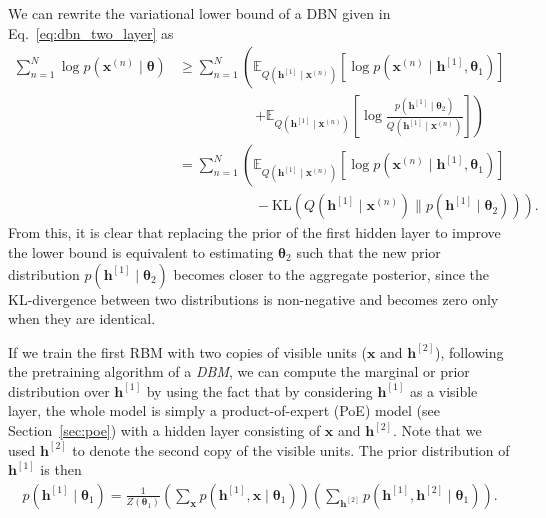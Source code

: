 \documentclass[dissertation,nocontribution,draft*]{aaltoseries}
\newcommand{\qlay}[1]{\left[#1\right]}
\newcommand{\vect}[1]{\mathbf{#1}}
\newcommand{\vects}[1]{\boldsymbol{#1}}
\newcommand{\vh}[0]{\vect{h}}
\newcommand{\vx}[0]{\vect{x}}
\newcommand{\TT}[0]{{\vects{\theta}}}
\newcommand{\KL}[0]{\text{KL}}
\newcommand{\E}[0]{\mathbb{E}}
\begin{document}
We can rewrite the variational lower bound of a 
DBN 
given in
Eq.~\eqref{eq:dbn_two_layer} as
\begin{align}
    \label{eq:dbn_two_layer2}
    \sum_{n=1}^N \log p(\vx^{(n)} \mid \TT) 
    &\geq 
    \sum_{n=1}^N \left(\E_{Q(\vh^{\qlay{1}} \mid \vx^{(n)})} \left[
    \log p(\vx^{(n)} \mid \vh^{\qlay{1}}, \TT_1) \right]
    \right.
    \nonumber \\
    &\phantom{= \sum_{n=1}^N (\E}\left.+\E_{Q(\vh^{\qlay{1}} \mid \vx^{(n)})} \left[ 
    \log \frac{p(\vh^{\qlay{1}} \mid
    \TT_2)}{Q(\vh^{\qlay{1}}\mid\vx^{(n)})}
    \right] \right)
    \nonumber \\
    &=\sum_{n=1}^N 
    \left(\E_{Q(\vh^{\qlay{1}} \mid \vx^{(n)})} \left[
    \log p(\vx^{(n)} \mid \vh^{\qlay{1}}, \TT_1) \right]
    \right.
    \nonumber \\
    &\phantom{=\sum_{n=1}^N (\E}- \left.\KL\left(
    Q(\vh^{\qlay{1}}\mid\vx^{(n)}) \| p(\vh^{\qlay{1}}\mid
    \TT_2) \right)
    \right).
\end{align}
From this, it is clear that replacing the prior of the first
hidden layer to improve the lower bound is equivalent to
estimating $\TT_2$ such that the new prior distribution
$p(\vh^{\qlay{1}}\mid\TT_2)$ becomes closer to the aggregate
posterior, since the KL-divergence between two distributions
is non-negative and becomes zero only when they are
identical.

If we train the first RBM with two copies of visible
units ($\vx$ and $\vh^{\qlay{2}}$), following the pretraining algorithm of a
\textit{DBM}, we can compute the marginal or prior
distribution over $\vh^{\qlay{1}}$ by using the fact that by
considering $\vh^{\qlay{1}}$ as a visible layer, the whole model
is simply a product-of-expert (PoE) model (see
Section~\ref{sec:poe}) with a hidden layer consisting of
$\vx$ and $\vh^{\qlay{2}}$. Note that we used $\vh^{\qlay{2}}$ to
denote the second copy of the visible units. The prior
distribution of $\vh^{\qlay{1}}$ is then
\begin{align}
    \label{eq:dbm_prior1}
    p(\vh^{\qlay{1}} \mid \TT_1) = \frac{1}{Z(\TT_1)} \left(
    \sum_{\vx} p(\vh^{\qlay{1}}, \vx \mid \TT_1) \right) \left(
    \sum_{\vh^{\qlay{2}}} p(\vh^{\qlay{1}}, \vh^{\qlay{2}} \mid \TT_1)
    \right).
\end{align}
\end{document}
